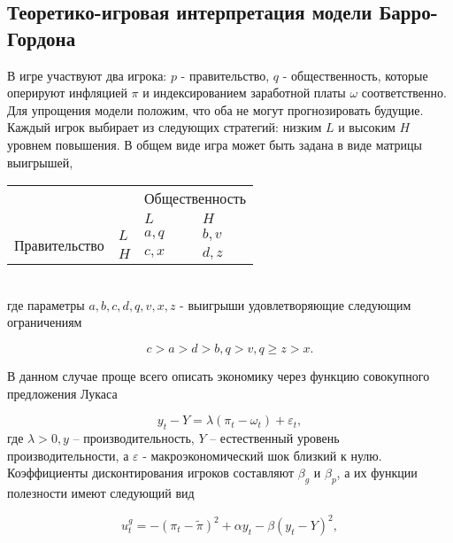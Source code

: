 
\subsection{Теоретико-игровая интерпретация модели Барро-Гордона}

В игре участвуют два игрока: $p$ - правительство, $q$ - общественность, которые оперируют инфляцией $\pi$  и индексированием заработной платы $\omega$ соответственно. Для упрощения модели положим, что оба не могут прогнозировать будущие. Каждый игрок выбирает из следующих стратегий: низким $L$  и высоким  $H$ уровнем повышения. В общем виде игра может быть задана в виде матрицы выигрышей, 
\begin{table}[h]
	\centering
\begin{tabular}{|l|l|l|l|}
	\hline
	\multicolumn{2}{|l|}{\multirow{2}{*}{}} & \multicolumn{2}{l|}{Общественность} \\ \cline{3-4} 
	\multicolumn{2}{|l|}{}                  & $L$            & $H$            \\ \hline
	\multirow{2}{*}{Правительство}     & $L$     & $a,q$          & $b,v$          \\ \cline{2-4} 
	& $H$     & $c,x$          & $d,z$          \\ \hline
\end{tabular}
\end{table}\\
где параметры $a,b,c,d,q,v,x,z$  - выигрыши удовлетворяющие следующим ограничениям

\begin{equation}
c>a>d>b, q>v, q\ge z>x.
\label{eq:sec:ot:restrictions}
\end{equation}

В данном случае проще всего описать экономику через функцию совокупного предложения Лукаса

\begin{equation}
\label{eq:sec:ot:lucas}
y_t - Y = \lambda(\pi_t - \omega_t)+\varepsilon_t,
\end{equation}
где  $\lambda>0, y$  – производительность, $Y$ – естественный уровень производительности, а  $\varepsilon$ - макроэкономический шок близкий к нулю. Коэффициенты дисконтирования игроков составляют $\beta_g$ и $\beta_p$, а их функции  полезности  имеют следующий вид 

\begin{equation}
\label{eq:sec:ot:govUtil}
u^g_t=-(\pi_t - \tilde{\pi})^2 + \alpha y_t - \beta(y_t-Y)^2,
\end{equation}

